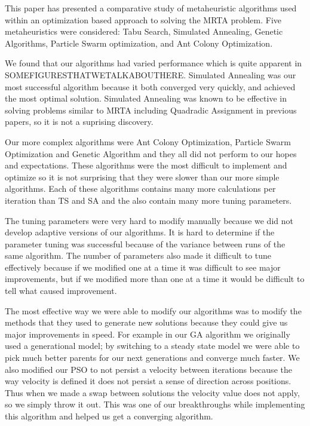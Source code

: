 \documentclass[a4paper]{article}
\begin{document}
This paper has presented a comparative study of metaheuristic algorithms used within an optimization based approach to solving the MRTA problem. Five metaheuristics were considered: Tabu Search, Simulated Annealing, Genetic Algorithms, Particle Swarm optimization, and Ant Colony Optimization.

We found that our algorithms had varied performance which is quite apparent in SOMEFIGURESTHATWETALKABOUTHERE. Simulated Annealing was our most successful algorithm because it both converged very quickly, and achieved the most optimal solution. Simulated Annealing was known to be effective in solving problems similar to MRTA including Quadradic Assignment in previous papers, so it is not a suprising discovery\cite{Badreldin}.

Our more complex algorithms were Ant Colony Optimization, Particle Swarm Optimization and Genetic Algorithm and they all did not perform to our hopes and expectations. These algorithms were the most difficult to implement and optimize so it is not surprising that they were slower than our more simple algorithms. Each of these algorithms contains many more calculations per iteration than TS and SA and the also contain many more tuning parameters.

The tuning parameters were very hard to modify manually because we did not develop adaptive versions of our algorithms. It is hard to determine if the parameter tuning was successful because of the variance between runs of the same algorithm. The number of parameters also made it difficult to tune effectively because if we modified one at a time it was difficult to see major improvements, but if we modified more than one at a time it would be difficult to tell what caused improvement.

The most effective way we were able to modify our algorithms was to modify the methods that they used to generate new solutions because they could give us major improvements in speed. For example in our GA algorithm we originally used a generational model; by switching to a steady state model we were able to pick much better parents for our next generations and converge much faster. We also modified our PSO to not persist a velocity between iterations because the way velocity is defined it does not persist a sense of direction across positions. Thus when we made a swap between solutions the velocity value does not apply, so we simply throw it out. This was one of our breakthroughs while implementing this algorithm and helped us get a converging algorithm.
\end{document}
